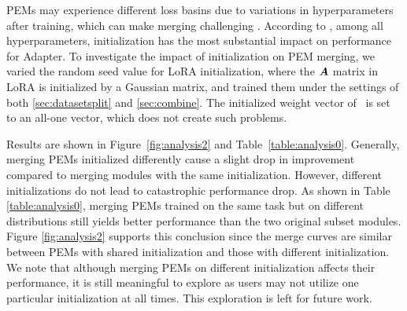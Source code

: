PEMs may experience different loss basins due to variations in hyperparameters after training, which can make merging challenging \citep{ainsworth2022git}. According to \citet{qin2022exploring}, among all hyperparameters, initialization has the most substantial impact on performance for Adapter.
To investigate the impact of initialization on PEM merging, we varied the random seed value for LoRA initialization, where the ${\bm{A}}$ matrix in LoRA is initialized by a Gaussian matrix, and trained them under the settings of both \textsection \ref{sec:datasetsplit} and \textsection \ref{sec:combine}. 
The initialized weight vector of \ia~is set to an all-one vector, which does not create such problems.

Results are shown in Figure~\ref{fig:analysis2} and Table~\ref{table:analysis0}.
Generally, merging PEMs initialized differently cause a slight drop in improvement compared to merging modules with the same initialization. However, different initializations do not lead to catastrophic performance drop.
As shown in Table \ref{table:analysis0}, merging PEMs trained on the same task but on different distributions still yields better performance than the two original subset modules. 
Figure \ref{fig:analysis2} supports this conclusion since the merge curves are similar between PEMs with shared initialization and those with different initialization.
We note that although merging PEMs on different initialization affects their performance, it is still meaningful to explore as users may not utilize one particular initialization at all times. This exploration is left for future work.


